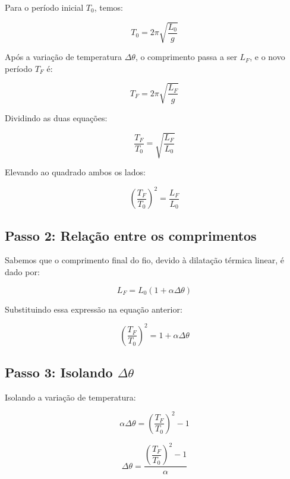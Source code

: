 \documentclass[a4paper,12pt]{article}
\begin{document}
\begin{flushleft}
Para o período inicial $T_0$, temos:

\begin{equation}
T_0 = 2\pi \sqrt{\frac{L_0}{g}}
\end{equation}

Após a variação de temperatura $\Delta \theta$, o comprimento passa a ser $L_F$, e o novo período $T_F$ é:

\begin{equation}
T_F = 2\pi \sqrt{\frac{L_F}{g}}
\end{equation}

Dividindo as duas equações:

\begin{equation}
\frac{T_F}{T_0} = \sqrt{\frac{L_F}{L_0}}
\end{equation}

Elevando ao quadrado ambos os lados:

\begin{equation}
\left(\frac{T_F}{T_0}\right)^2 = \frac{L_F}{L_0}
\end{equation}

\subsection*{Passo 2: Relação entre os comprimentos}

Sabemos que o comprimento final do fio, devido à dilatação térmica linear, é dado por:

\begin{equation}
L_F = L_0 \left( 1 + \alpha \Delta \theta \right)
\end{equation}

Substituindo essa expressão na equação anterior:

\begin{equation}
\left(\frac{T_F}{T_0}\right)^2 = 1 + \alpha \Delta \theta
\end{equation}

\subsection*{Passo 3: Isolando $\Delta \theta$}

Isolando a variação de temperatura:

\begin{equation}
\alpha \Delta \theta = \left(\frac{T_F}{T_0}\right)^2 - 1
\end{equation}

\begin{equation}
\Delta \theta = \frac{\left(\dfrac{T_F}{T_0}\right)^2 - 1}{\alpha}
\end{equation}


\end{flushleft}
\end{document}
